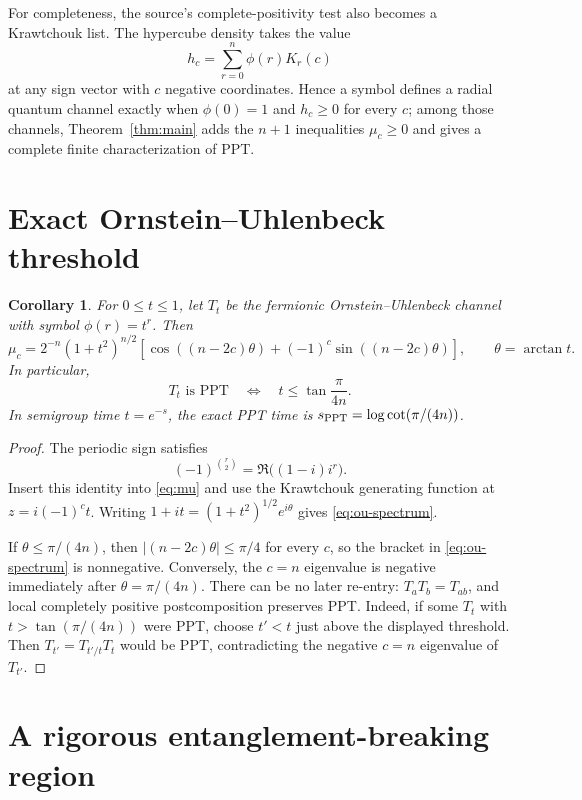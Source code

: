 \documentclass[11pt]{article}
\newtheorem{corollary}[theorem]{Corollary}
\begin{document}
For completeness, the source's complete-positivity test also becomes a
Krawtchouk list.  The hypercube density takes the value
\[
 h_c=\sum_{r=0}^n\phi(r)K_r(c)
\]
at any sign vector with $c$ negative coordinates.  Hence a symbol defines a
radial quantum channel exactly when $\phi(0)=1$ and $h_c\ge0$ for every $c$;
among those channels, Theorem~\ref{thm:main} adds the $n+1$ inequalities
$\mu_c\ge0$ and gives a complete finite characterization of PPT.

\section{Exact Ornstein--Uhlenbeck threshold}

\begin{corollary}\label{cor:ou}
For $0\le t\le1$, let $T_t$ be the fermionic Ornstein--Uhlenbeck channel
with symbol $\phi(r)=t^r$.  Then
\begin{equation}\label{eq:ou-spectrum}
 \mu_c=2^{-n}(1+t^2)^{n/2}
 \left[\cos((n-2c)\theta)+(-1)^c\sin((n-2c)\theta)\right],
 \qquad \theta=\arctan t.
\end{equation}
In particular,
\[
 T_t\text{ is PPT}
 \quad\Longleftrightarrow\quad
 t\le\tan\frac{\pi}{4n}.
\]
In semigroup time $t=e^{-s}$, the exact PPT time is
$s_{\rm PPT}=\log\cot(\pi/(4n))$.
\end{corollary}

\begin{proof}
The periodic sign satisfies
\[
 (-1)^{\binom r2}=\Re\big((1-i)i^r\big).
\]
Insert this identity into \eqref{eq:mu} and use the Krawtchouk generating
function at $z=i(-1)^ct$.  Writing $1+it=(1+t^2)^{1/2}e^{i\theta}$ gives
\eqref{eq:ou-spectrum}.

If $\theta\le\pi/(4n)$, then
$|(n-2c)\theta|\le\pi/4$ for every $c$, so the bracket in
\eqref{eq:ou-spectrum} is nonnegative.  Conversely, the $c=n$ eigenvalue is
negative immediately after $\theta=\pi/(4n)$.  There can be no later re-entry:
$T_aT_b=T_{ab}$, and local completely positive postcomposition preserves PPT.
Indeed, if some $T_t$ with $t>\tan(\pi/(4n))$ were PPT, choose $t'<t$ just
above the displayed threshold.  Then $T_{t'}=T_{t'/t}T_t$ would be PPT,
contradicting the negative $c=n$ eigenvalue of $T_{t'}$.
\end{proof}

\section{A rigorous entanglement-breaking region}
\end{document}
